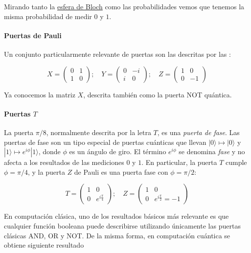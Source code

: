 \documentclass[11pt]{article}
\newcommand{\ra}{\rangle}
\newcommand{\ra}{\rangle}
\begin{document}
Mirando tanto la \href{URL}{esfera de Bloch} como las probabilidades vemos que tenemos la misma probabilidad de medir $0$ y $1$.

\paragraph*{Puertas de Pauli}

Un conjunto particularmente relevante de puertas son las descritas por las :

\[
X =
	\begin{pmatrix}
		0 & 1 \\
		1 & 0 
	\end{pmatrix}; \quad
	Y =
	\begin{pmatrix}
		0 & -i \\
		i & 0 
	\end{pmatrix}; \quad
	Z =
	\begin{pmatrix}
		1 & 0 \\
		0 & -1 
	\end{pmatrix}
\]

Ya conocemos la matriz $X$, descrita también como la puerta NOT quántica.

\paragraph*{Puertas $T$}

La puerta $\pi/8$, normalmente descrita por la letra $T$, es una \emph{puerta de fase}. Las puertas de fase son un tipo especial de puertas cuánticas que llevan $|0\ra \mapsto |0\ra$ y $|1\ra \mapsto e^{i\phi}|1\ra$, donde $\phi$ es un ángulo de giro. El término $e^{i\phi}$ se denomina \emph{fase} y no afecta a los resultados de las mediciones $0$ y $1$. En particular, la puerta $T$ cumple $\phi = \pi/4$, y la puerta $Z$ de Pauli es una puerta fase con $\phi = \pi/2$:

\[
	T =
	\begin{pmatrix}
		1 & 0 \\
		0 & e^{i\frac{\pi}{4}}
	\end{pmatrix}; \quad
	Z =
	\begin{pmatrix}
		1 & 0 \\
		0 & e^{i\frac{\pi}{2}} = -1
	\end{pmatrix}
\]

En computación clásica, uno de los resultados básicos más relevante es que cualquier función booleana puede describirse utilizando únicamente las puertas clásicas AND, OR y NOT. De la misma forma, en computación cuántica se obtiene siguiente resultado
\end{document}
